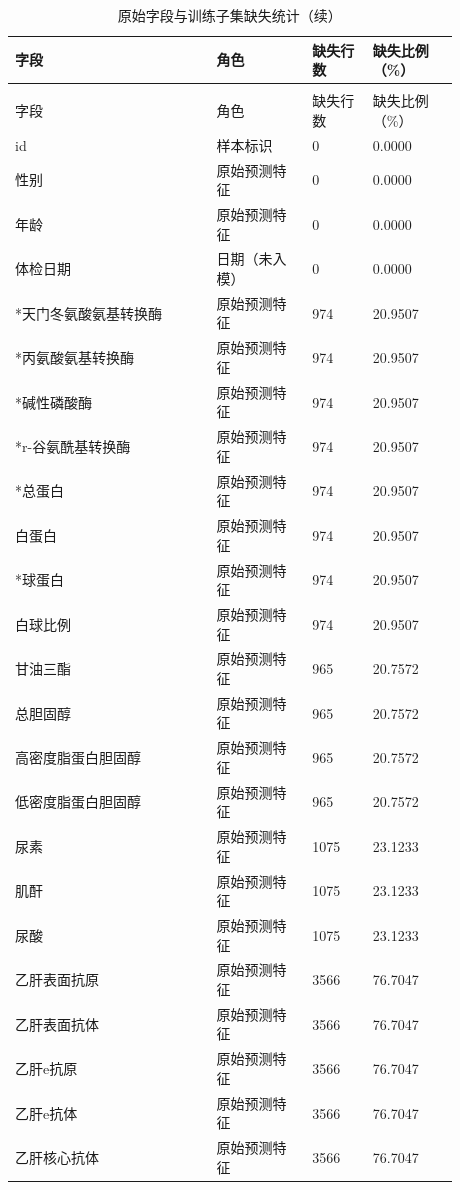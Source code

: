 \begingroup
\small
\setlength{\tabcolsep}{5pt}
\begin{longtable}{L{0.4\linewidth}L{0.19\linewidth}L{0.12\linewidth}L{0.17\linewidth}}
\caption{原始字段与训练子集缺失统计}\label{tab:all-fields}\\
\toprule
字段 & 角色 & 缺失行数 & 缺失比例（\%） \\
\midrule
\endfirsthead
\caption[]{原始字段与训练子集缺失统计（续）}\\
\toprule
字段 & 角色 & 缺失行数 & 缺失比例（\%） \\
\midrule
\endhead
id & 样本标识 & 0 & 0.0000 \\
性别 & 原始预测特征 & 0 & 0.0000 \\
年龄 & 原始预测特征 & 0 & 0.0000 \\
体检日期 & 日期（未入模） & 0 & 0.0000 \\
*天门冬氨酸氨基转换酶 & 原始预测特征 & 974 & 20.9507 \\
*丙氨酸氨基转换酶 & 原始预测特征 & 974 & 20.9507 \\
*碱性磷酸酶 & 原始预测特征 & 974 & 20.9507 \\
*r-谷氨酰基转换酶 & 原始预测特征 & 974 & 20.9507 \\
*总蛋白 & 原始预测特征 & 974 & 20.9507 \\
白蛋白 & 原始预测特征 & 974 & 20.9507 \\
*球蛋白 & 原始预测特征 & 974 & 20.9507 \\
白球比例 & 原始预测特征 & 974 & 20.9507 \\
甘油三酯 & 原始预测特征 & 965 & 20.7572 \\
总胆固醇 & 原始预测特征 & 965 & 20.7572 \\
高密度脂蛋白胆固醇 & 原始预测特征 & 965 & 20.7572 \\
低密度脂蛋白胆固醇 & 原始预测特征 & 965 & 20.7572 \\
尿素 & 原始预测特征 & 1075 & 23.1233 \\
肌酐 & 原始预测特征 & 1075 & 23.1233 \\
尿酸 & 原始预测特征 & 1075 & 23.1233 \\
乙肝表面抗原 & 原始预测特征 & 3566 & 76.7047 \\
乙肝表面抗体 & 原始预测特征 & 3566 & 76.7047 \\
乙肝e抗原 & 原始预测特征 & 3566 & 76.7047 \\
乙肝e抗体 & 原始预测特征 & 3566 & 76.7047 \\
乙肝核心抗体 & 原始预测特征 & 3566 & 76.7047 \\

\end{longtable}
